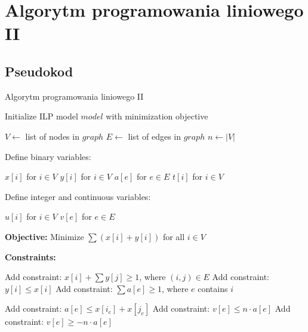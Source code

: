\section{Algorytm programowania liniowego II}

\subsection{Pseudokod}
\begin{algorithm}
    \caption*{Algorytm programowania liniowego II}
    \begin{algorithmic}[1]
            \State Initialize ILP model $model$ with minimization objective
    
            \State $V \gets$ list of nodes in $graph$
            \State $E \gets$ list of edges in $graph$
            \State $n \gets |V|$ 
    
            \State Define binary variables:

            \State $x[i]$ for $i \in V$ 
            \State $y[i]$ for $i \in V$ 
            \State $a[e]$ for $e \in E$ 
            \State $t[i]$ for $i \in V$ 

    
            \State Define integer and continuous variables:

            \State $u[i]$ for $i \in V$ 
            \State $v[e]$ for $e \in E$ 


            \State \textbf{Objective:}
            \State Minimize $\sum (x[i] + y[i])$ for all $i \in V$
    
            \State \textbf{Constraints:}
    
             
                \State Add constraint: $x[i] + \sum y[j] \geq 1$, where $(i,j) \in E$
                \State Add constraint: $y[i] \leq x[i]$
                \State Add constraint: $\sum a[e] \geq 1$, where $e$ contains $i$
            \EndFor
    
                \State Add constraint: $a[e] \leq x[i_e] + x[j_e]$
                \State Add constraint: $v[e] \leq n \cdot a[e]$
                \State Add constraint: $v[e] \geq -n \cdot a[e]$
            \EndFor
    

\end{algorithmic}
\end{algorithm}
